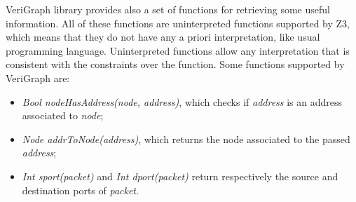 VeriGraph library provides also a set of functions for retrieving some useful information. All of these functions are uninterpreted functions supported by Z3, which means that they do not have any a priori interpretation, like usual programming language. Uninterpreted functions allow any interpretation that is consistent with the constraints over the function. Some functions supported by VeriGraph are:
\begin{itemize}
	\item \textit{Bool nodeHasAddress(node, address)}, which checks if \textit{address} is an address associated to \textit{node};
	\item \textit{Node addrToNode(address)}, which returns the node associated to the passed \textit{address};
	\item \textit{Int sport(packet)} and \textit{Int dport(packet)} return respectively the source and destination ports of \textit{packet}.
\end{itemize} 

